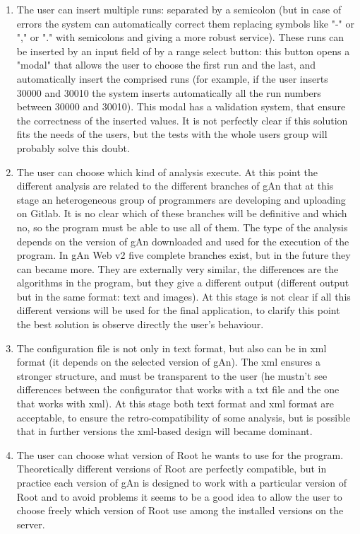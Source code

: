 \begin{enumerate}

\item The user can insert multiple runs: separated by a semicolon (but in case of errors the system can automatically correct them replacing symbols like "-" or "," or "." with semicolons and giving a more robust service). These runs can be inserted by an input field of by a range select button: this button opens a "modal" that allows the user to choose the first run and the last, and automatically insert the comprised runs (for example, if the user inserts 30000 and 30010 the system inserts automatically all the run numbers between 30000 and 30010). This modal has a validation system, that ensure the correctness of the inserted values. It is not perfectly clear if this solution fits the needs of the users, but the tests with the whole users group will probably solve this doubt. 

\item The user can choose which kind of analysis execute. At this point the different analysis are related to the different branches of gAn that at this stage an heterogeneous group of programmers are developing and uploading on Gitlab. It is no clear which of these branches will be definitive and which no, so the program must be able to use all of them. The type of the analysis depends on the version of gAn downloaded and used for the execution of the program. In gAn Web v2 five complete branches exist, but in the future they can became more. They are externally very similar, the differences are the algorithms in the program, but they give a different output (different output but in the same format: text and images). 
At this stage is not clear if all this different versions will be used for the final application, to clarify this point the best solution is observe directly the user's behaviour. 

\item The configuration file is not only in text format, but also can be in xml format (it depends on the selected version of gAn). The xml ensures a stronger structure, and must be transparent to the user (he mustn't see differences between the configurator that works with a txt file and the one that works with xml). At this stage both text format and xml format are acceptable, to ensure the retro-compatibility of some analysis, but is possible that in further versions the xml-based design will became dominant. 

\item The user can choose what version of Root he wants to use for the program. Theoretically different versions of Root are perfectly compatible, but in practice each version of gAn is designed to work with a particular version of Root and to avoid problems it seems to be a good idea to allow the user to choose freely which version of Root use among the installed versions on the server.  


\end{enumerate}
